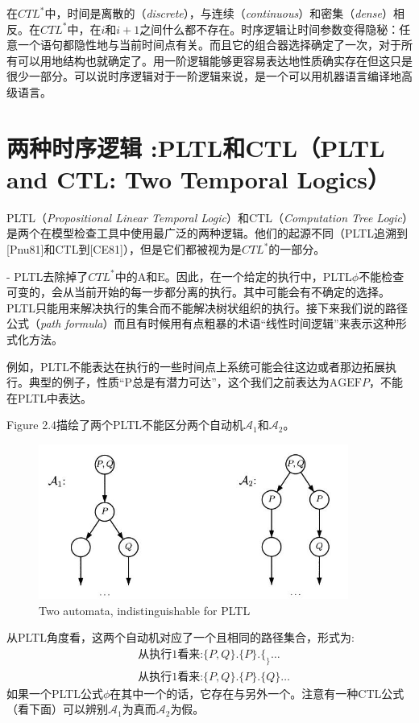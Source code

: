 \documentclass{book}
\begin{document}
    在$CTL^*$中，时间是离散的（{\itshape discrete}），与连续（{\itshape continuous}）和密集（{\itshape dense}）相反。在$CTL^*$中，在$i$和$i+1$之间什么都不存在。时序逻辑让时间参数变得隐秘：任意一个语句都隐性地与当前时间点有关。而且它的组合器选择确定了一次，对于所有可以用地结构也就确定了。用一阶逻辑能够更容易表达地性质确实存在但这只是很少一部分。可以说时序逻辑对于一阶逻辑来说，是一个可以用机器语言编译地高级语言。
    
    \section{两种时序逻辑 :PLTL和CTL（PLTL and CTL: Two Temporal Logics）}
    
    PLTL（{\itshape Propositional Linear Temporal Logic}）和CTL（{\itshape Computation Tree Logic}）是两个在模型检查工具中使用最广泛的两种逻辑。他们的起源不同（PLTL追溯到[Pnu81]和CTL到[CE81]），但是它们都被视为是$CTL^*$的一部分。
    
    - PLTL去除掉了$CTL^*$中的$\mathrm{A}$和$\mathrm{E}$。因此，在一个给定的执行中，PLTL$\phi$不能检查可变的，会从当前开始的每一步都分离的执行。其中可能会有不确定的选择。PLTL只能用来解决执行的集合而不能解决树状组织的执行。接下来我们说的路径公式（{\itshape path formula}）而且有时候用有点粗暴的术语“线性时间逻辑”来表示这种形式化方法。
    
    例如，PLTL不能表达在执行的一些时间点上系统可能会往这边或者那边拓展执行。典型的例子，性质“P总是有潜力可达”，这个我们之前表达为$\mathrm{A}\mathrm{G}\mathrm{E}\mathrm{F}P$，不能在PLTL中表达。
    
    Figure 2.4描绘了两个PLTL不能区分两个自动机$\mathcal{A}_1$和$\mathcal{A}_2$。
    \begin{figure}
        \centering
        \includegraphics[width=4.0in,height=2.0in]{2_4.jpg}
        \caption{Two automata, indistinguishable for PLTL}
    \end{figure}
    
    从PLTL角度看，这两个自动机对应了一个且相同的路径集合，形式为:
    \begin{equation*}
      \begin{aligned}
        & \text{从执行1看来:}\{P,Q\}.\{P\}.\{_\}\dots \\
        & \text{从执行1看来:}\{P,Q\}.\{P\}.\{Q\}\dots
      \end{aligned}
    \end{equation*}
    如果一个PLTL公式$\phi$在其中一个的话，它存在与另外一个。注意有一种CTL公式（看下面）可以辨别$\mathcal{A}_1$为真而$\mathcal{A}_2$为假。
    
\end{document}
